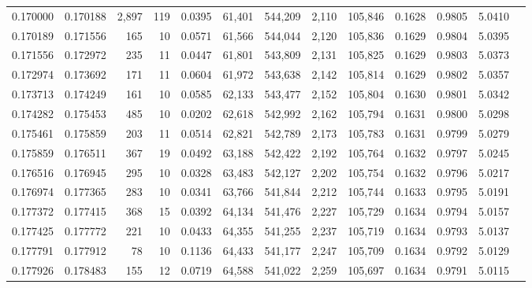 \begin{tabular}{rrrrrrrrrrrrr}
0.170000 & 0.170188 & 2,897 & 119 &                                     0.0395 &  61,401 & 544,209 &   2,110 & 105,846 & 0.1628 & 0.9805 & 5.0410 \\
0.170189 & 0.171556 &   165 &  10 &                                     0.0571 &  61,566 & 544,044 &   2,120 & 105,836 & 0.1629 & 0.9804 & 5.0395 \\
0.171556 & 0.172972 &   235 &  11 &                                     0.0447 &  61,801 & 543,809 &   2,131 & 105,825 & 0.1629 & 0.9803 & 5.0373 \\
0.172974 & 0.173692 &   171 &  11 &                                     0.0604 &  61,972 & 543,638 &   2,142 & 105,814 & 0.1629 & 0.9802 & 5.0357 \\
0.173713 & 0.174249 &   161 &  10 &                                     0.0585 &  62,133 & 543,477 &   2,152 & 105,804 & 0.1630 & 0.9801 & 5.0342 \\
0.174282 & 0.175453 &   485 &  10 &                                     0.0202 &  62,618 & 542,992 &   2,162 & 105,794 & 0.1631 & 0.9800 & 5.0298 \\
0.175461 & 0.175859 &   203 &  11 &                                     0.0514 &  62,821 & 542,789 &   2,173 & 105,783 & 0.1631 & 0.9799 & 5.0279 \\
0.175859 & 0.176511 &   367 &  19 &                                     0.0492 &  63,188 & 542,422 &   2,192 & 105,764 & 0.1632 & 0.9797 & 5.0245 \\
0.176516 & 0.176945 &   295 &  10 &                                     0.0328 &  63,483 & 542,127 &   2,202 & 105,754 & 0.1632 & 0.9796 & 5.0217 \\
0.176974 & 0.177365 &   283 &  10 &                                     0.0341 &  63,766 & 541,844 &   2,212 & 105,744 & 0.1633 & 0.9795 & 5.0191 \\
0.177372 & 0.177415 &   368 &  15 &                                     0.0392 &  64,134 & 541,476 &   2,227 & 105,729 & 0.1634 & 0.9794 & 5.0157 \\
0.177425 & 0.177772 &   221 &  10 &                                     0.0433 &  64,355 & 541,255 &   2,237 & 105,719 & 0.1634 & 0.9793 & 5.0137 \\
0.177791 & 0.177912 &    78 &  10 &                                     0.1136 &  64,433 & 541,177 &   2,247 & 105,709 & 0.1634 & 0.9792 & 5.0129 \\
0.177926 & 0.178483 &   155 &  12 &                                     0.0719 &  64,588 & 541,022 &   2,259 & 105,697 & 0.1634 & 0.9791 & 5.0115 \\

\end{tabular}
